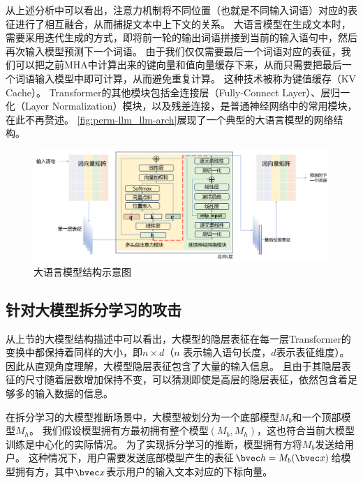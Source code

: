 从上述分析中可以看出，注意力机制将不同位置（也就是不同输入词语）对应的表征进行了相互融合，从而捕捉文本中上下文的关系。
%
大语言模型在生成文本时，需要采用迭代生成的方式，即将前一轮的输出词语拼接到当前的输入语句中，然后再次输入模型预测下一个词语。
%
由于我们仅仅需要最后一个词语对应的表征，我们可以把之前MHA中计算出来的键向量和值向量缓存下来，从而只需要把最后一个词语输入模型中即可计算，从而避免重复计算。
%
这种技术被称为键值缓存（KV Cache）。
%
Transformer的其他模块包括全连接层（Fully-Connect Layer）、层归一化（Layer Normalization）模块，以及残差连接，是普通神经网络中的常用模块，在此不再赘述。
%
\autoref{fig:perm-llm_llm-arch}展现了一个典型的大语言模型的网络结构。

\begin{figure}[htbp]
    \centering
    \includegraphics[width=\linewidth]{Z_Resources/perm-llm_llm-architecture.png}
    \caption{大语言模型结构示意图}
    \label{fig:perm-llm_llm-arch}
\end{figure}


\subsection{针对大模型拆分学习的攻击}
从上节的大模型结构描述中可以看出，大模型的隐层表征在每一层Transformer的变换中都保持着同样的大小，即$n \times d$（$n$ 表示输入语句长度，$d$表示表征维度）。
%
因此从直观角度理解，大模型隐层表征包含了大量的输入信息。
且由于其隐层表征的尺寸随着层数增加保持不变，可以猜测即使是高层的隐层表征，依然包含着足够多的输入数据的信息。
%

在拆分学习的大模型推断场景中，大模型被划分为一个底部模型$M_b$和一个顶部模型$M_h$。
%
我们假设模型拥有方最初拥有整个模型$(M_b, M_h)$，这也符合当前大模型训练是中心化的实际情况。
%
为了实现拆分学习的推断，模型拥有方将$M_b$发送给用户。
%
这种情况下，用户需要发送底部模型产生的表征$\bvec h = M_b(\bvec x)$给模型拥有方，其中$\bvec x$表示用户的输入文本对应的下标向量。

